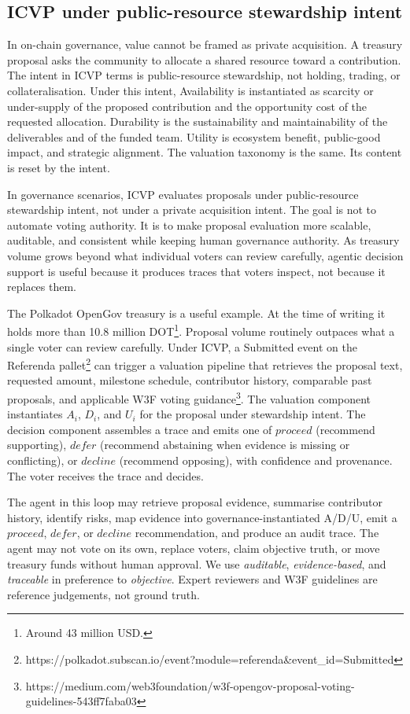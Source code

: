 \subsection{ICVP under public-resource stewardship intent}

In on-chain governance, value cannot be framed as private acquisition. A treasury proposal asks the community to allocate a shared resource toward a contribution. The intent in ICVP terms is public-resource stewardship, not holding, trading, or collateralisation. Under this intent, Availability is instantiated as scarcity or under-supply of the proposed contribution and the opportunity cost of the requested allocation. Durability is the sustainability and maintainability of the deliverables and of the funded team. Utility is ecosystem benefit, public-good impact, and strategic alignment. The valuation taxonomy is the same. Its content is reset by the intent.

In governance scenarios, ICVP evaluates proposals under public-resource stewardship intent, not under a private acquisition intent. The goal is not to automate voting authority. It is to make proposal evaluation more scalable, auditable, and consistent while keeping human governance authority. As treasury volume grows beyond what individual voters can review carefully, agentic decision support is useful because it produces traces that voters inspect, not because it replaces them.

The Polkadot OpenGov treasury is a useful example. At the time of writing it holds more than 10.8 million DOT\footnote{Around 43 million USD.}. Proposal volume routinely outpaces what a single voter can review carefully. Under ICVP, a Submitted event on the Referenda pallet\footnote{https://polkadot.subscan.io/event?module=referenda\&event_id=Submitted} can trigger a valuation pipeline that retrieves the proposal text, requested amount, milestone schedule, contributor history, comparable past proposals, and applicable W3F voting guidance\footnote{https://medium.com/web3foundation/w3f-opengov-proposal-voting-guidelines-543ff7faba03}. The valuation component instantiates $A_i$, $D_i$, and $U_i$ for the proposal under stewardship intent. The decision component assembles a trace and emits one of $\textit{proceed}$ (recommend supporting), $\textit{defer}$ (recommend abstaining when evidence is missing or conflicting), or $\textit{decline}$ (recommend opposing), with confidence and provenance. The voter receives the trace and decides.

The agent in this loop may retrieve proposal evidence, summarise contributor history, identify risks, map evidence into governance-instantiated A/D/U, emit a $\textit{proceed}$, $\textit{defer}$, or $\textit{decline}$ recommendation, and produce an audit trace. The agent may not vote on its own, replace voters, claim objective truth, or move treasury funds without human approval. We use \emph{auditable}, \emph{evidence-based}, and \emph{traceable} in preference to \emph{objective}. Expert reviewers and W3F guidelines are reference judgements, not ground truth.

